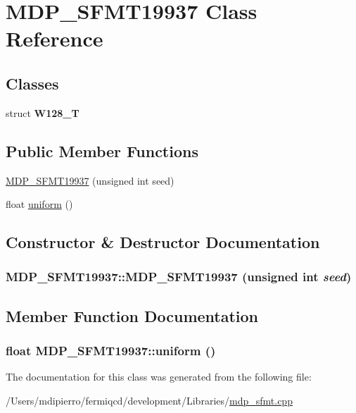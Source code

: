 \hypertarget{class_m_d_p___s_f_m_t19937}{
\section{MDP\_\-SFMT19937 Class Reference}
\label{class_m_d_p___s_f_m_t19937}
}
\subsection*{Classes}
\begin{DoxyCompactItemize}
\item 
struct {\bfseries W128\_\-T}
\end{DoxyCompactItemize}
\subsection*{Public Member Functions}
\begin{DoxyCompactItemize}
\item 
\hyperlink{class_m_d_p___s_f_m_t19937_a6b9f762f4912b38a2876d3294f0656a5}{MDP\_\-SFMT19937} (unsigned int seed)
\item 
float \hyperlink{class_m_d_p___s_f_m_t19937_a4fb0c462ea1b8bd45b0ffef52777035c}{uniform} ()
\end{DoxyCompactItemize}


\subsection{Constructor \& Destructor Documentation}
\hypertarget{class_m_d_p___s_f_m_t19937_a6b9f762f4912b38a2876d3294f0656a5}{
\subsubsection[{MDP\_\-SFMT19937}]{\setlength{\rightskip}{0pt plus 5cm}MDP\_\-SFMT19937::MDP\_\-SFMT19937 (unsigned int {\em seed})}}
\label{class_m_d_p___s_f_m_t19937_a6b9f762f4912b38a2876d3294f0656a5}


\subsection{Member Function Documentation}
\hypertarget{class_m_d_p___s_f_m_t19937_a4fb0c462ea1b8bd45b0ffef52777035c}{
\subsubsection[{uniform}]{\setlength{\rightskip}{0pt plus 5cm}float MDP\_\-SFMT19937::uniform ()}}
\label{class_m_d_p___s_f_m_t19937_a4fb0c462ea1b8bd45b0ffef52777035c}


The documentation for this class was generated from the following file:\begin{DoxyCompactItemize}
\item 
/Users/mdipierro/fermiqcd/development/Libraries/\hyperlink{mdp__sfmt_8cpp}{mdp\_\-sfmt.cpp}\end{DoxyCompactItemize}
